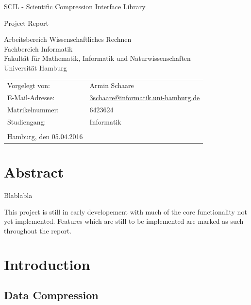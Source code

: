 \documentclass[
	12pt,
	a4paper,
	BCOR10mm,
	DIV14,
	headsepline,
]{scrreprt}
\begin{document}
\begin{titlepage}
	\begin{center}
		{\titlefont\huge SCIL - Scientific Compression Interface Library\par}

		\bigskip
		\bigskip

		{\Large Project Report\par}

		\bigskip
		\bigskip

		{\large Arbeitsbereich Wissenschaftliches Rechnen\\
		Fachbereich Informatik\\
		Fakultät für Mathematik, Informatik und Naturwissenschaften\\
		Universität Hamburg\par}
	\end{center}

	\vfill

	{\large\begin{tabular}{ll}
		Vorgelegt von:  & Armin Schaare \\
		E-Mail-Adresse: & \href{mailto:adresse@email.de}{3schaare@informatik.uni-hamburg.de} \\
		Matrikelnummer: & 6423624 \\
		Studiengang:    & Informatik \\
		\\
		Hamburg, den 05.04.2016
	\end{tabular}\par}
\end{titlepage}

\chapter*{Abstract}

\thispagestyle{empty}


Blablabla \par
This project is still in early developement with much of the core functionality
not yet implemented. Features which are still to be implemented are marked as
such throughout the report.

\tableofcontents

\chapter{Introduction}
\label{Introduction}

\section{Data Compression}
\end{document}
